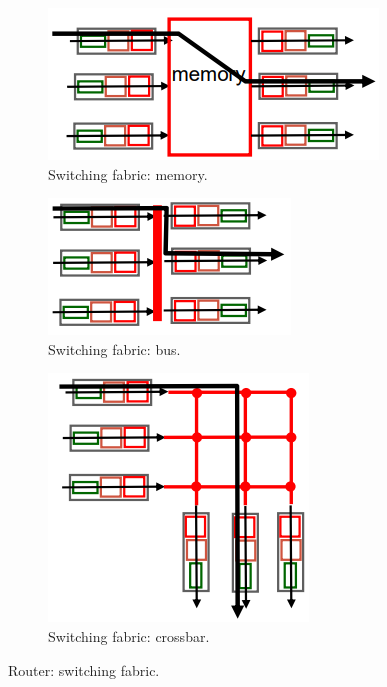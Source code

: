 \documentclass[11pt, italian, openany]{book}
\begin{document}
\begin{sloppypar}
\begin{figure}[!h]
	\begin{subfigure}[t]{0.32 \linewidth} \centering
		\includegraphics[scale=0.45]{images/switching-fabric-memory.png}
		\caption{Switching fabric: memory.}
	\end{subfigure}
	\begin{subfigure}[t]{0.32 \linewidth} \centering
		\includegraphics[scale=0.45]{images/switching-fabric-bus.png}
		\caption{Switching fabric: bus.}
	\end{subfigure}
	\begin{subfigure}[t]{0.32 \linewidth} \centering
		\includegraphics[scale=0.45]{images/switching-fabric-crossbar.png}
		\caption{Switching fabric: crossbar.}
	\end{subfigure}
	\caption{Router: switching fabric.}
	\label{fig:switching-fabric}
\end{figure}


\end{sloppypar}
\end{document}
